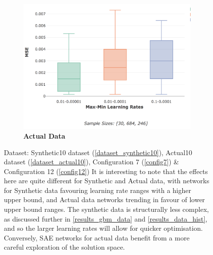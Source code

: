 \documentclass[a4paper,11pt,oneside]{article}
\theoremstyle{plain}
\theoremstyle{definition}
\begin{document}
\begin{figure}[H]
\begin{subfigure}{.5\textwidth}
			\includegraphics[scale=0.3]{images/results/network/lr/actual_mse_minmax_lr.png}
			\caption{\textbf{Actual Data} 
				\newline }
			\label{figure-actual_mse_minmax_lr}
		\end{subfigure}
		\caption[SAE MSE by Learning Rates]{Dataset: Synthetic10 dataset (\ref{dataset_synthetic10}), Actual10 dataset (\ref{dataset_actual10}), Configuration 7 (\ref{config7}) \& Configuration 12 (\ref{config12})
			\newline It is interesting to  note that the effects here are quite different for Synthetic and Actual data, with networks for Synthetic data favouring learning rate ranges with a higher upper bound, and Actual data networks trending in favour of lower upper bound ranges. The synthetic data is structurally less complex, as discussed further in \ref{results_gbm_data} and \ref{results_data_hist}, and so the larger learning rates will allow for quicker optimisation. Conversely, SAE networks for actual data benefit from a more careful exploration of the solution space.}
		\label{figure-mse_lr}
	\end{figure}
	
\end{document}
